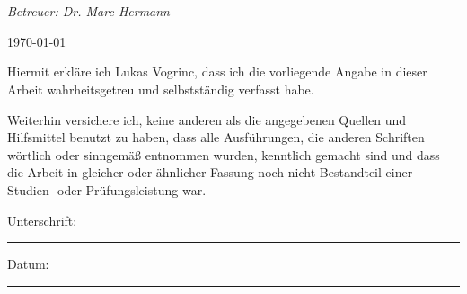 \documentclass[
11pt, %
oneside, %
ngerman, %
singlespacing, %
headsepline, %
]{MastersDoctoralThesis} %
\begin{document}
\begin{titlepage}
\begin{center}
		\vfill

		\textit{}\\[0.4cm]
		\textit{}\\[8cm] %
		\emph{Betreuer: Dr. Marc Hermann} \\

		\vfill

		{\large \today}\\[4cm] %

		\vfill
	\end{center}
\end{titlepage}


\begin{declaration}
	\addchaptertocentry{\authorshipname} %
	\noindent Hiermit erkläre ich Lukas Vogrinc, dass ich die vorliegende Angabe in dieser Arbeit wahrheitsgetreu und selbstständig verfasst habe.\bigskip

	\noindent Weiterhin versichere ich, keine anderen als die angegebenen Quellen und Hilfsmittel benutzt zu haben, dass alle Ausführungen, die anderen Schriften wörtlich oder sinngemäß entnommen wurden, kenntlich gemacht sind und dass die Arbeit in gleicher oder ähnlicher Fassung noch nicht Bestandteil einer Studien- oder Prüfungsleistung war.\bigskip

	\noindent Unterschrift:\bigskip
	\rule{25em}{0.1pt} %

	\noindent Datum:\bigskip
	\rule{25em}{0.5pt} %
\end{declaration}

\cleardoublepage



\end{document}
